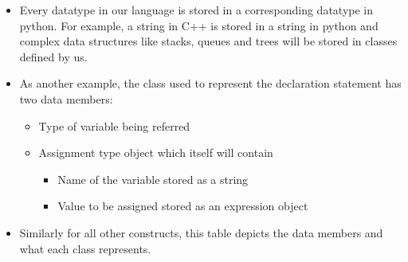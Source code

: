\documentclass{article}
\begin{document}
\begin{itemize}
\item Every datatype in our language is stored in a corresponding datatype in python. For example, a string in C++ is stored in a string in python and complex data structures like stacks, queues and trees will be stored in classes defined by us.
\item As another example, the class used to represent the declaration statement has two data members:
\begin{itemize}
\item Type of variable being referred
\item Assignment type object which itself will contain 
\begin{itemize}
    \item Name of the variable stored as a string
    \item Value to be assigned stored as an expression object
\end{itemize}
\end{itemize}
\item Similarly for all other constructs, this table depicts the data members and what each class  represents.



\end{itemize}
\end{document}
